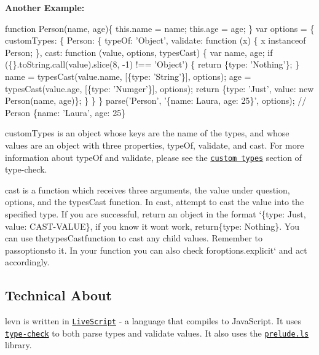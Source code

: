 {\bfseries Another Example\+:} 
\begin{DoxyCode}
\textcolor{keyword}{function} Person(name, age)\{
  this.name = name;
  this.age = age;
\}
var options = \{
  customTypes: \{
    Person: \{
      typeOf: \textcolor{stringliteral}{'Object'},
      validate: \textcolor{keyword}{function} (x) \{
        x instanceof Person;
      \},
      cast: \textcolor{keyword}{function} (value, options, typesCast) \{
        var name, age;
        \textcolor{keywordflow}{if} (\{\}.toString.call(value).slice(8, -1) !== \textcolor{stringliteral}{'Object'}) \{
          \textcolor{keywordflow}{return} \{type: \textcolor{stringliteral}{'Nothing'}\};
        \}
        name = typesCast(value.name, [\{type: \textcolor{stringliteral}{'String'}\}], options);
        age = typesCast(value.age, [\{type: \textcolor{stringliteral}{'Numger'}\}], options);
        \textcolor{keywordflow}{return} \{type: \textcolor{stringliteral}{'Just'}, value: \textcolor{keyword}{new} Person(name, age)\};
    \}
  \}
\}
parse(\textcolor{stringliteral}{'Person'}, \textcolor{stringliteral}{'\{name: Laura, age: 25\}'}, options); \textcolor{comment}{// Person \{name: 'Laura', age: 25\}}
\end{DoxyCode}


{\ttfamily custom\+Types} is an object whose keys are the name of the types, and whose values are an object with three properties, {\ttfamily type\+Of}, {\ttfamily validate}, and {\ttfamily cast}. For more information about {\ttfamily type\+Of} and {\ttfamily validate}, please see the \href{https://github.com/gkz/type-check#custom-types}{\tt custom types} section of type-\/check.

{\ttfamily cast} is a function which receives three arguments, the value under question, options, and the types\+Cast function. In {\ttfamily cast}, attempt to cast the value into the specified type. If you are successful, return an object in the format `\{type\+: \textquotesingle{}Just\textquotesingle{}, value\+: C\+A\+S\+T-\/\+V\+A\+L\+U\+E\}{\ttfamily , if you know it won\textquotesingle{}t work, return}\{type\+: \textquotesingle{}Nothing\textquotesingle{}\}{\ttfamily . You can use the}types\+Cast{\ttfamily function to cast any child values. Remember to pass}options{\ttfamily to it. In your function you can also check for}options.\+explicit` and act accordingly.

\subsection*{Technical About}

{\ttfamily levn} is written in \href{http://livescript.net/}{\tt Live\+Script} -\/ a language that compiles to Java\+Script. It uses \href{https://github.com/gkz/type-check}{\tt type-\/check} to both parse types and validate values. It also uses the \href{http://preludels.com/}{\tt prelude.\+ls} library. 
